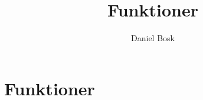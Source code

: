 \documentclass[a4paper,10pt,oneside,openright,
               oldfontcommands]{memoir}
\begin{document}
\title{%
  Funktioner
}
\author{Daniel Bosk}

\maketitle

\begin{abstract}
  
\end{abstract}

\clearpage

\tableofcontents*

\chapter{Funktioner}



\appendix


\printbibliography
\end{document}
